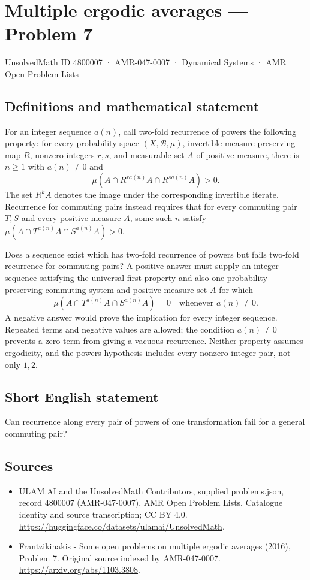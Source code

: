 \documentclass[11pt,a4paper]{article}
\begin{document}
\section*{Multiple ergodic averages — Problem 7}\label{4800007}
{\small UnsolvedMath ID 4800007 · AMR-047-0007 · Dynamical Systems · AMR Open Problem Lists}
\subsection{Definitions and mathematical statement}
For an integer sequence $a(n)$, call two-fold recurrence
of powers the following property: for every probability
space $(X,\mathcal B,\mu)$, invertible measure-preserving
map $R$, nonzero integers $r,s$, and measurable set $A$
of positive measure, there is $n\ge1$ with $a(n)\ne0$ and
\[
                    \mu(A\cap R^{r a(n)}A
                              \cap R^{s a(n)}A)>0.
\]
The set $R^kA$ denotes the image under the corresponding
invertible iterate. Recurrence for commuting pairs instead
requires that for every commuting pair $T,S$ and every
positive-measure $A$, some such $n$ satisfy
$\mu(A\cap T^{a(n)}A\cap S^{a(n)}A)>0$.

Does a sequence exist which has two-fold recurrence of
powers but fails two-fold recurrence for commuting pairs?
A positive answer must supply an integer sequence satisfying
the universal first property and also one probability-preserving
commuting system and positive-measure set $A$ for which
\[
        \mu(A\cap T^{a(n)}A\cap S^{a(n)}A)=0
        \quad\text{whenever }a(n)\ne0.
\]
A negative answer would prove the implication for every
integer sequence. Repeated terms and negative values are
allowed; the condition $a(n)\ne0$ prevents a zero term
from giving a vacuous recurrence. Neither property assumes
ergodicity, and the powers hypothesis includes every nonzero
integer pair, not only $1,2$.
\subsection{Short English statement}
Can recurrence along every pair of powers of one transformation fail for a general commuting pair?
\subsection{Sources}
\begin{itemize}
\item[S1] ULAM.AI and the UnsolvedMath Contributors, supplied problems.json, record 4800007 (AMR-047-0007), AMR Open Problem Lists. Catalogue identity and source transcription; CC BY 4.0.
\url{https://huggingface.co/datasets/ulamai/UnsolvedMath}.
\item[S2] Frantzikinakis - Some open problems on multiple ergodic averages (2016), Problem 7. Original source indexed by AMR-047-0007.
\url{https://arxiv.org/abs/1103.3808}.
\end{itemize}
\end{document}
